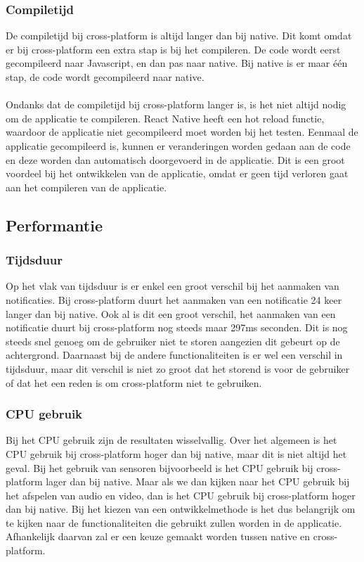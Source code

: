\subsubsection{Compiletijd}
De compiletijd bij cross-platform is altijd langer dan bij native. Dit komt omdat er bij cross-platform
een extra stap is bij het compileren. De code wordt eerst gecompileerd naar Javascript, en dan pas naar native.
Bij native is er maar één stap, de code wordt gecompileerd naar native.
\\\\
Ondanks dat de compiletijd bij cross-platform langer is, is het niet altijd nodig om de applicatie te compileren.
React Native heeft een hot reload functie, waardoor de applicatie niet gecompileerd moet worden bij het testen.
Eenmaal de applicatie gecompileerd is, kunnen er veranderingen worden gedaan aan de code en deze worden dan
automatisch doorgevoerd in de applicatie. Dit is een groot voordeel bij het ontwikkelen van de applicatie,
omdat er geen tijd verloren gaat aan het compileren van de applicatie.

\subsection{Performantie}
\subsubsection{Tijdsduur}
Op het vlak van tijdsduur is er enkel een groot verschil bij het aanmaken van notificaties.
Bij cross-platform duurt het aanmaken van een notificatie 24 keer langer dan bij native.
Ook al is dit een groot verschil, het aanmaken van een notificatie duurt bij cross-platform 
nog steeds maar 297ms seconden. Dit is nog steeds snel genoeg om de gebruiker niet te storen 
aangezien dit gebeurt op de achtergrond. Daarnaast bij de andere functionaliteiten is er wel een verschil
in tijdsduur, maar dit verschil is niet zo groot dat het storend is voor de gebruiker of dat het een 
reden is om cross-platform niet te gebruiken.

\subsubsection{CPU gebruik}
Bij het CPU gebruik zijn de resultaten wisselvallig. Over het algemeen is het CPU gebruik bij cross-platform
hoger dan bij native, maar dit is niet altijd het geval. Bij het gebruik van sensoren bijvoorbeeld is het CPU gebruik
bij cross-platform lager dan bij native. Maar als we dan kijken naar het CPU gebruik bij het afspelen van audio en 
video, dan is het CPU gebruik bij cross-platform hoger dan bij native. Bij het kiezen van een ontwikkelmethode is het 
dus belangrijk om te kijken naar de functionaliteiten die gebruikt zullen worden in de applicatie. Afhankelijk 
daarvan zal er een keuze gemaakt worden tussen native en cross-platform.


